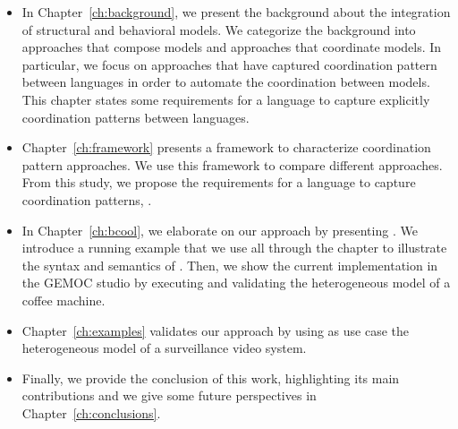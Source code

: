 \begin{itemize}
\item In Chapter~\ref{ch:background}, we present the background about the integration of structural and behavioral models. We categorize the background into approaches that compose models and approaches that coordinate models. In particular, we focus on approaches that have captured coordination pattern between languages in order to automate the coordination between models. This chapter states some requirements for a language to capture explicitly coordination patterns between languages.    

\item Chapter~\ref{ch:framework} presents a framework to characterize coordination pattern approaches. We use this framework to compare different approaches. From this study, we propose the requirements for a language to capture coordination patterns, \ie \bcool.  

\item In Chapter~\ref{ch:bcool}, we elaborate on our approach by presenting \bcool. We introduce a running example that we use all through the chapter to illustrate the syntax and semantics of \bcool. Then, we show the current implementation in the GEMOC studio by executing and validating the heterogeneous model of a coffee machine. 

\item Chapter~\ref{ch:examples} validates our approach by using as use case the heterogeneous model of a surveillance video system.

\item Finally, we provide the conclusion of this work, highlighting its main contributions and we give some future perspectives in Chapter~\ref{ch:conclusions}.

	
	
\end{itemize}

